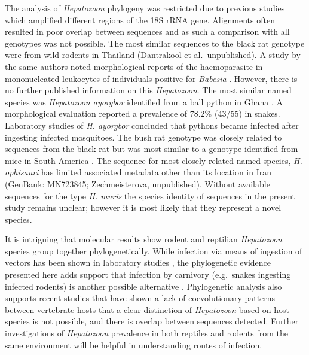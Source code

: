 \documentclass[a4paper, nobind]{templates/ociamthesis}
\begin{document}
The analysis of \emph{Hepatozoon} phylogeny was restricted due to previous studies which amplified different regions of the 18S rRNA gene.
Alignments often resulted in poor overlap between sequences and as such a comparison with all genotypes was not possible.
The most similar sequences to the black rat genotype were from wild rodents in Thailand (Dantrakool et al.~unpublished).
A study by the same authors noted morphological reports of the haemoparasite in mononucleated leukocytes of individuals positive for \emph{Babesia} \autocite{dantrakoolIdentificationNewType2004}.
However, there is no further published information on this \emph{Hepatozoon}. The most similar named species was \emph{Hepatozoon ayorgbor} identified from a ball python in Ghana \autocite{slobodaNEWSPECIESHEPATOZOON2007}.
A morphological evaluation reported a prevalence of 78.2\% (43/55) in snakes.
Laboratory studies of \emph{H. ayorgbor} concluded that pythons became infected after ingesting infected mosquitoes.
The bush rat genotype was closely related to sequences from the black rat but was most similar to a genotype identified from mice in South America \autocite{merinoMolecularCharacterizationAncient2009}.
The sequence for most closely related named species, \emph{H. ophisauri} has limited associated metadata other than its location in Iran (GenBank: MN723845; Zechmeisterova, unpublished).
Without available sequences for the type \emph{H. muris} the species identity of sequences in the present study remains unclear; however it is most likely that they represent a novel species.

It is intriguing that molecular results show rodent and reptilian \emph{Hepatozoon} species group together phylogenetically.
While infection via means of ingestion of vectors has been shown in laboratory studies \autocite{slobodaNEWSPECIESHEPATOZOON2007}, the phylogenetic evidence presented here adds support that infection by carnivory (e.g.~snakes ingesting infected rodents) is another possible alternative \autocite{harrisPrevalenceDiversityHepatozoon2015}.
Phylogenetic analysis also supports recent studies that have shown a lack of coevolutionary patterns between vertebrate hosts \autocite{maiaMOLECULARASSESSMENTHEPATOZOON2014,harrisPrevalenceDiversityHepatozoon2015}
that a clear distinction of \emph{Hepatozoon} based on host species is not possible, and there is overlap between sequences detected.
Further investigations of \emph{Hepatozoon} prevalence in both reptiles and rodents from the same environment will be helpful in understanding routes of infection.
\end{document}
